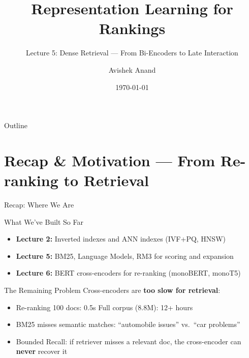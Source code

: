 \documentclass[aspectratio=169]{beamer}
\title[Dense Retrieval]{Representation Learning for Rankings}
\subtitle{Lecture 5: Dense Retrieval --- From Bi-Encoders to Late Interaction}
\author{Avishek Anand}
\institute{Information Retrieval}
\date{\today}
\newif\ifanimated
\newcommand{\cpause}{\ifanimated\pause\fi}
\begin{document}
\begin{frame}
\titlepage
\end{frame}

\begin{frame}{Outline}
\tableofcontents
\end{frame}

\section{Recap \& Motivation --- From Re-ranking to Retrieval}

\begin{frame}[plain]
\sectionpage
\end{frame}

\begin{frame}{Recap: Where We Are}
\begin{block}{What We've Built So Far}
\begin{itemize}
    \item \textbf{Lecture 2:} Inverted indexes and ANN indexes (IVF+PQ, HNSW)
    \item \textbf{Lecture 5:} BM25, Language Models, RM3 for scoring and expansion
    \item \textbf{Lecture 6:} BERT cross-encoders for re-ranking (monoBERT, monoT5)
\end{itemize}\cpause
\end{block}

\vspace{1em}

\begin{alertblock}{The Remaining Problem}
Cross-encoders are \textbf{too slow for retrieval}:
\begin{itemize}
    \item Re-ranking 100 docs: 0.5s \textcolor{green}{\checkmark} \quad Full corpus (8.8M): 12+ hours \textcolor{red}{}
    \item BM25 misses semantic matches: ``automobile issues'' vs.\ ``car problems''
    \item Bounded Recall: if retriever misses a relevant doc, the cross-encoder can \textbf{never} recover it
\end{itemize}
\end{alertblock}
\end{frame}
\end{document}
